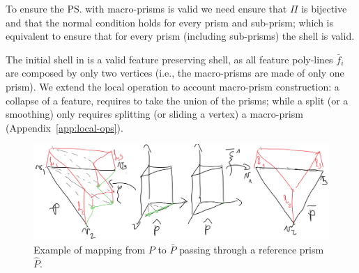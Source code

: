 To ensure the \ps{} with macro-prisms is valid we need ensure that $\Pi$ is bijective and that the normal condition holds for every prism and sub-prism; which is equivalent to ensure that for every prism (including sub-prisms) the shell is valid.

The initial shell in \cite{jiang2020bijective} is a valid feature preserving shell, as all feature poly-lines $\bar f_i$ are composed by only two vertices (i.e., the macro-prisms are made of only one prism). We extend the local operation to account macro-prism construction: a collapse of a feature, requires to take the union of the prisms; while a split (or a smoothing) only requires splitting (or sliding a vertex) a macro-prism (Appendix~\ref{app:local-ops}).


\begin{figure}
    \centering
    \includegraphics[width=\linewidth]{curve_meshing_in_shell_tex/figs/mappings}
    \caption{Example of mapping from $P$ to $\bar P$ passing through a reference prism $\hat P$.}
    \label{bichon:fig:ref-mapping}
\end{figure}